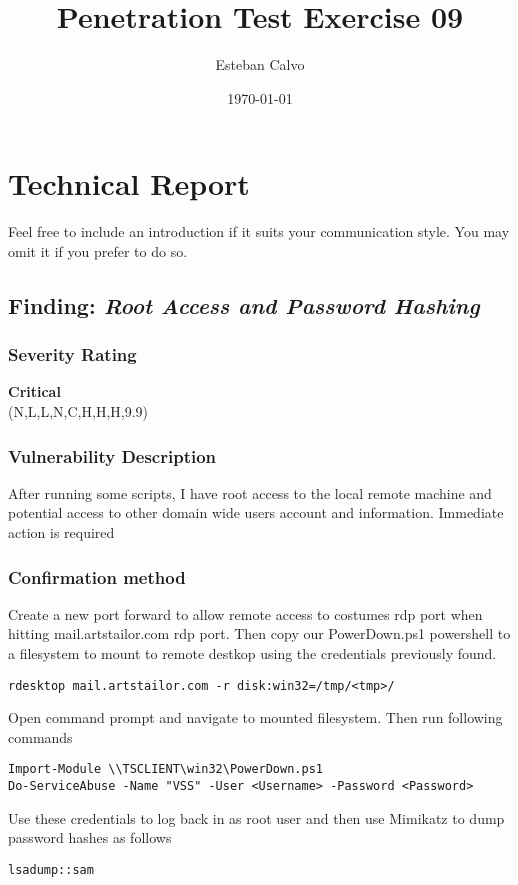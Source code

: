 \documentclass[notitlepage]{article}
\begin{document}
  
\title{Penetration Test Exercise 09}
\author{Esteban Calvo}
\date{\isodate\today}

\maketitle

\tableofcontents

\newpage

\section{Technical Report}

Feel free to include an introduction if it suits your communication style.
You may omit it if you prefer to do so.


  \subsection{Finding: \emph{Root Access and Password Hashing}}
	\subsubsection*{Severity Rating}
        \textbf{Critical} \\
		\cvss(N,L,L,N,C,H,H,H,9.9)
		
  	\subsubsection*{Vulnerability Description}
  		After running some scripts, I have root access to the local remote machine and potential
        access to other domain wide users account and information. Immediate action is required

  	\subsubsection*{Confirmation method}
  	Create a new port forward to allow remote access to costumes rdp port when hitting mail.artstailor.com
    rdp port. Then copy our PowerDown.ps1 powershell to a filesystem to mount to remote destkop using
    the credentials previously found.
    \begin{verbatim}
rdesktop mail.artstailor.com -r disk:win32=/tmp/<tmp>/
    \end{verbatim}
    Open command prompt and navigate to mounted filesystem. Then run following commands
    \begin{verbatim}
Import-Module \\TSCLIENT\win32\PowerDown.ps1
Do-ServiceAbuse -Name "VSS" -User <Username> -Password <Password>
    \end{verbatim}
    Use these credentials to log back in as root user and then use Mimikatz to dump password hashes as follows
    \begin{verbatim}
lsadump::sam
    \end{verbatim}
\end{document}
